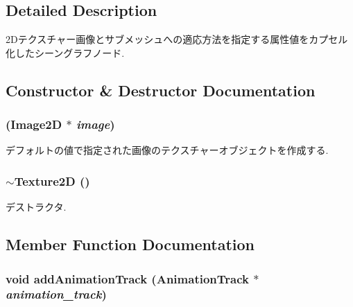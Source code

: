\subsection{Detailed Description}
2Dテクスチャー画像とサブメッシュへの適応方法を指定する属性値をカプセル化したシーングラフノード. 

\subsection{Constructor \& Destructor Documentation}
\hypertarget{classm3g_1_1Texture2D_7a8d6431e41022e29ac936afc5e97b8e}{
\subsubsection[{Texture2D}]{ ({\bf Image2D} $\ast$ {\em image})}}
\label{classm3g_1_1Texture2D_7a8d6431e41022e29ac936afc5e97b8e}


デフォルトの値で指定された画像のテクスチャーオブジェクトを作成する. \hypertarget{classm3g_1_1Texture2D_060332aea614a81a914cd2e55f1794df}{
\subsubsection[{$\sim$Texture2D}]{\setlength{\rightskip}{0pt plus 5cm}$\sim${\bf Texture2D} ()}}
\label{classm3g_1_1Texture2D_060332aea614a81a914cd2e55f1794df}


デストラクタ. 

\subsection{Member Function Documentation}
\hypertarget{classm3g_1_1Texture2D_415c0b110f95410ded9b85e5d99a496b}{
\subsubsection[{addAnimationTrack}]{\setlength{\rightskip}{0pt plus 5cm}void addAnimationTrack ({\bf AnimationTrack} $\ast$ {\em animation\_\-track})}}
\label{classm3g_1_1Texture2D_415c0b110f95410ded9b85e5d99a496b}


